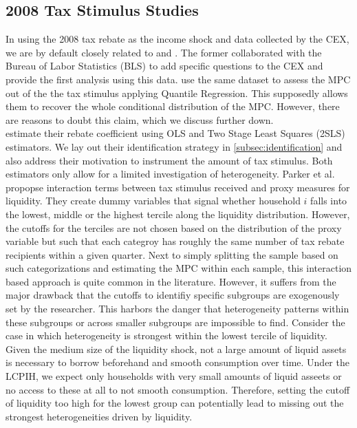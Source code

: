 \subsection{2008 Tax Stimulus Studies}
In using the 2008 tax rebate as the income shock and data collected by the CEX, we are by default closely related to \cite{parker_etal_13} and \cite{ms_14}. The former collaborated with the Bureau of Labor Statistics (BLS) to add specific questions to the CEX and provide the first analysis using this data. \cite{ms_14} use the same dataset to assess the MPC out of the the tax stimulus applying Quantile Regression. This supposedly allows them to recover the whole conditional distribution of the MPC. However, there are reasons to doubt this claim, which we discuss further down. \\
\cite{parker_etal_13} estimate their rebate coefficient using OLS and Two Stage Least Squares (2SLS) estimators. We lay out their identification strategy in \ref{subsec:identification} and also address their motivation to instrument the amount of tax stimulus. Both estimators only allow for a limited investigation of heterogeneity. Parker et al. propopse interaction terms between tax stimulus received and proxy measures for liquidity. They create dummy variables that signal whether household $i$ falls into the lowest, middle or the highest tercile along the liquidity distribution. However, the cutoffs for the terciles are not chosen based on the distribution of the proxy variable but such that each categroy has roughly the same number of tax rebate recipients within a given quarter. Next to simply splitting the sample based on such categorizations and estimating the MPC within each sample, this interaction based approach is quite common in the literature. However, it suffers from the major drawback that the cutoffs to identifiy specific subgroups are exogenously set by the researcher. This harbors the danger that heterogeneity patterns within these subgroups or across smaller subgroups are impossible to find. Consider the case in which heterogeneity is strongest within the lowest tercile of liquidity. Given the medium size of the liquidity shock, not a large amount of liquid assets is necessary to borrow beforehand and smooth consumption over time. Under the LCPIH, we expect only households with very small amounts of liquid asseets or no access to these at all to not smooth consumption. Therefore, setting the cutoff of liquidity too high for the lowest group can potentially lead to missing out the strongest heterogeneities driven by liquidity. \\
